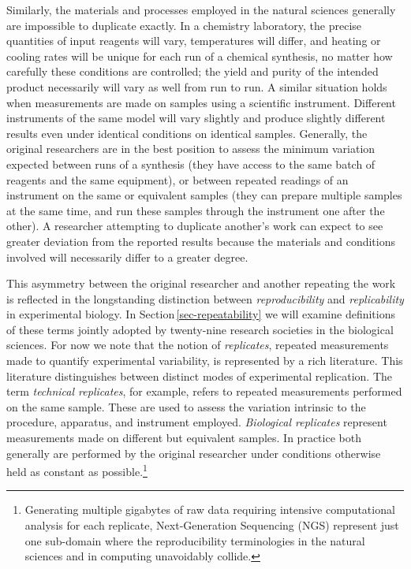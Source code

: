 Similarly, the materials and processes employed in the natural sciences generally are impossible
	to duplicate exactly.
In a chemistry laboratory, the precise quantities of input reagents will vary, temperatures will differ, and heating
	or cooling rates will be unique for each run of a chemical synthesis, no matter how carefully these conditions
	are controlled; the yield and purity of the intended product necessarily will vary as well from run to run.
A similar situation holds when measurements are made on samples using a scientific instrument. 
Different instruments of the same model will vary slightly and produce slightly different results even
	under identical conditions on identical samples.
Generally, the original researchers are in the best position to assess the minimum variation expected
	between runs of a synthesis (they have access to the same batch of reagents and the same equipment), 
	or between repeated readings of an instrument on the same or equivalent samples (they can prepare
	multiple samples at the same time, and run these samples through the instrument one after the other).
A researcher attempting to duplicate another's work can expect to see greater deviation from the reported results	
	because the materials and conditions involved will necessarily differ to a greater degree.

This asymmetry between the original researcher and another repeating the work is reflected in the longstanding
	distinction between \emph{reproducibility} and \emph{replicability} in experimental biology.  
In  Section\,\ref{sec-repeatability}  we will examine definitions of these terms jointly adopted by twenty-nine research
	societies in the biological sciences.  
For now we note that the notion of \emph{replicates}, repeated measurements made to quantify 
	experimental variability, is represented by a rich literature.
This literature distinguishes between distinct modes of experimental replication.
The term \emph{technical replicates}, for example, refers to repeated measurements performed on the same sample.
These are used to assess the variation intrinsic to the procedure, apparatus, and instrument employed.
\emph{Biological replicates} represent measurements made on different but equivalent samples.
In practice both generally are performed by the original researcher under conditions otherwise
	held as constant as possible.\footnote{Generating multiple gigabytes of raw data requiring intensive computational analysis for each replicate, Next-Generation Sequencing (NGS) represent just one sub-domain where the reproducibility 
	terminologies in the natural sciences and in computing
        unavoidably collide.}



